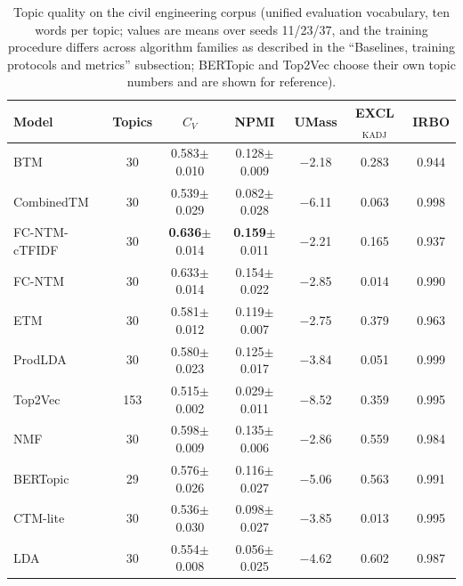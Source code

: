 \documentclass[Journal,letterpaper]{ascelike-new}
\newcommand{\fcntm}{FC-NTM}
\begin{document}
 \begin{table}[t]
\centering
\caption{Topic quality on the civil engineering corpus (unified evaluation vocabulary, ten words per topic; values are means over seeds 11/23/37, and the training procedure differs across algorithm families as described in the ``Baselines, training protocols and metrics'' subsection; BERTopic and Top2Vec choose their own topic numbers and are shown for reference).}
\label{tab:civil}
\small
\begin{tabular}{lcccccc}
\toprule
Model & Topics & $C_V$ & NPMI & UMass & EXCL$_{\mathrm{KADJ}}$ & IRBO \\
\midrule
BTM & 30 & 0.583$\pm$0.010 & 0.128$\pm$0.009 & $-$2.18 & 0.283 & 0.944 \\
CombinedTM & 30 & 0.539$\pm$0.029 & 0.082$\pm$0.028 & $-$6.11 & 0.063 & 0.998 \\
\fcntm{}-cTFIDF & 30 & \textbf{0.636}$\pm$0.014 & \textbf{0.159}$\pm$0.011 & $-$2.21 & 0.165 & 0.937 \\
\fcntm{} & 30 & 0.633$\pm$0.014 & 0.154$\pm$0.022 & $-$2.85 & 0.014 & 0.990 \\
ETM & 30 & 0.581$\pm$0.012 & 0.119$\pm$0.007 & $-$2.75 & 0.379 & 0.963 \\
ProdLDA & 30 & 0.580$\pm$0.023 & 0.125$\pm$0.017 & $-$3.84 & 0.051 & 0.999 \\
Top2Vec & 153 & 0.515$\pm$0.002 & 0.029$\pm$0.011 & $-$8.52 & 0.359 & 0.995 \\
NMF & 30 & 0.598$\pm$0.009 & 0.135$\pm$0.006 & $-$2.86 & 0.559 & 0.984 \\
BERTopic & 29 & 0.576$\pm$0.026 & 0.116$\pm$0.027 & $-$5.06 & 0.563 & 0.991 \\
CTM-lite & 30 & 0.536$\pm$0.030 & 0.098$\pm$0.027 & $-$3.85 & 0.013 & 0.995 \\
LDA & 30 & 0.554$\pm$0.008 & 0.056$\pm$0.025 & $-$4.62 & 0.602 & 0.987 \\
\bottomrule
\end{tabular}
\end{table}
\end{document}
